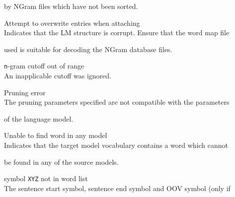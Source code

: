 \begin{itemize}
\begin{itemize}
        by NGram files which have not been sorted.


   Attempt to overwrite entries when attaching\\


        Indicates that the LM structure is corrupt. Ensure that the word map file


        used is suitable for decoding the NGram database files.


   \texttt{n}-gram cutoff out of range\\


        An inapplicable cutoff was ignored.


   Pruning error\\


        The pruning parameters specified are not compatible with the parameters 


        of the language model.


\end{itemize}















\begin{itemize}


   Unable to find word in any model\\


        Indicates that the target model vocabulary contains a word which cannot


        be found in any of the source models.


\end{itemize}


















\begin{itemize}


 symbol {\tt XYZ} not in word list\\


        The sentence start symbol, sentence end symbol and OOV symbol (only if



\end{itemize}
\end{itemize}
